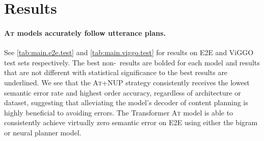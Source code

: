 %
%
%
%




\newcommand{\lsname}[1]{\textsc{#1}}
\newcommand{\lsshort}[1]{\textsc{#1}}
\newcommand{\size}[1]{|#1|}
\newcommand{\lin}{\pi}
\newcommand{\valstr}[1]{\textit{#1}}
\newcommand{\uttstr}[1]{\textit{#1}}
\newcommand{\alignshort}{AT}
\newcommand{\enc}{Enc}
\newcommand{\rep}{h}
\newcommand{\attrval}[2]{#1=#2}
\newcommand{\phraseAug}{+p}
\newcommand{\DA}[1]{\textsc{#1}}










  

\section{Results}


\paragraph{\lsshort{At} models accurately follow utterance plans.} See
\autoref{tab:main.e2e.test} and \autoref{tab:main.viggo.test} for results on
E2E and ViGGO test sets respectively.  
The best non-\Oracle~results are bolded for each model and results
that are not different with statistical significance to the best results
are underlined.
We see that the \lsshort{At+NUP}
strategy consistently receives the lowest semantic error rate and highest 
order accuracy, regardless of
architecture or dataset, suggesting that alleviating the model's decoder of content
planning is highly beneficial to avoiding errors. The Transformer \lsshort{At} model is able to consistently achieve virtually zero semantic error on E2E using either
the bigram or neural planner model.

